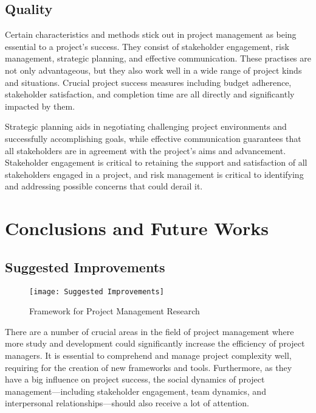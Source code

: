 \documentclass{article}
\begin{document}
\subsection{Quality}

Certain characteristics and methods stick out in project management as being essential to a project's success. They consist of stakeholder engagement, risk management, strategic planning, and effective communication. These practises are not only advantageous, but they also work well in a wide range of project kinds and situations. Crucial project success measures including budget adherence, stakeholder satisfaction, and completion time are all directly and significantly impacted by them.

Strategic planning aids in negotiating challenging project environments and successfully accomplishing goals, while effective communication guarantees that all stakeholders are in agreement with the project's aims and advancement. Stakeholder engagement is critical to retaining the support and satisfaction of all stakeholders engaged in a project, and risk management is critical to identifying and addressing possible concerns that could derail it.\cite{fernandes2013identifying}


\section{Conclusions and Future Works}
\subsection{Suggested Improvements}
\begin{figure}[htp]
    \centering
    \texttt{[image: Suggested Improvements]}
    \caption{Framework for Project Management Research}
    \label{fig:Suggested Improvements}
\end{figure}
There are a number of crucial areas in the field of project management where more study and development could significantly increase the efficiency of project managers. It is essential to comprehend and manage project complexity well, requiring for the creation of new frameworks and tools. Furthermore, as they have a big influence on project success, the social dynamics of project management—including stakeholder engagement, team dynamics, and interpersonal relationships—should also receive a lot of attention.
\end{document}

